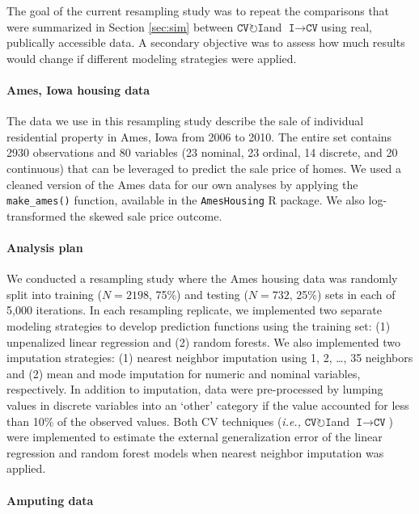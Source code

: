 \documentclass[AMA,STIX1COL,doublespace]{WileyNJD-v2}
\begin{document}
The goal of the current resampling study was to repeat the comparisons
that were summarized in Section \ref{sec:sim} between
$\texttt{CV}\!\circlearrowright\!\texttt{I}$\space and
$\texttt{I}\!\!\rightarrow\!\texttt{CV}$\space using real, publically
accessible data. A secondary objective was to assess how much results
would change if different modeling strategies were applied.

\paragraph{Ames, Iowa housing data}

The data we use in this resampling study describe the sale of individual
residential property in Ames, Iowa from 2006 to 2010. The entire set
contains 2930 observations and 80 variables (23 nominal, 23 ordinal, 14
discrete, and 20 continuous) that can be leveraged to predict the sale
price of homes.\cite{de2011ames} We used a cleaned version of the Ames
data for our own analyses by applying the \texttt{make\_ames()}
function, available in the \texttt{AmesHousing} R
package.\cite{AmesHousing} We also log-transformed the skewed sale price
outcome.

\paragraph{Analysis plan}

We conducted a resampling study where the Ames housing data was randomly
split into training (\(N = 2198\), 75\%) and testing (\(N = 732\), 25\%)
sets in each of 5,000 iterations. In each resampling replicate, we
implemented two separate modeling strategies to develop prediction
functions using the training set: (1) unpenalized linear regression and
(2) random forests. We also implemented two imputation strategies: (1)
nearest neighbor imputation using 1, 2, \ldots, 35 neighbors and (2)
mean and mode imputation for numeric and nominal variables,
respectively. In addition to imputation, data were pre-processed by
lumping values in discrete variables into an `other' category if the
value accounted for less than 10\% of the observed values. Both CV
techniques
(\textit{i.e., }$\texttt{CV}\!\circlearrowright\!\texttt{I}$\space and
$\texttt{I}\!\!\rightarrow\!\texttt{CV}$) were implemented to estimate
the external generalization error of the linear regression and random
forest models when nearest neighbor imputation was applied.

\paragraph{Amputing data}
\end{document}
